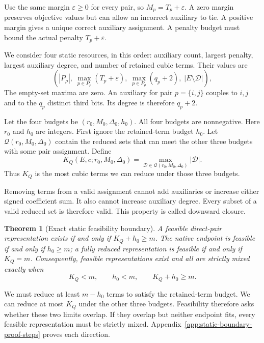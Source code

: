 \documentclass[a4paper,onecolumn,11pt,unpublished]{quantumarticle}
\newtheorem{theorem}[theorem]{Theorem}
\theoremstyle{remark}
\begin{document}
Use the same margin $\varepsilon\geq0$ for every pair, so
$M_p=T_p+\varepsilon$. A zero margin preserves objective values but can
allow an incorrect auxiliary to tie. A positive margin gives a unique
correct auxiliary assignment. A penalty budget must bound the actual
penalty $T_p+\varepsilon$.

We consider four static resources, in this order: auxiliary count, largest
penalty, largest auxiliary degree, and number of retained cubic terms.
Their values are
\[
 \left(|P_\rho|,\;\max_{p\in P_\rho}(T_p+\varepsilon),\;
 \max_{p\in P_\rho}(q_p+2),\;|E\setminus\mathcal D|\right),
\]
The empty-set maxima are zero. An auxiliary for pair $p=\{i,j\}$ couples
to $i,j$ and to the $q_p$ distinct third bits. Its degree is therefore
$q_p+2$.

Let the four budgets be $(r_0,M_0,\Delta_0,h_0)$.
All four budgets are nonnegative.
Here $r_0$ and $h_0$ are integers.
First ignore the retained-term budget $h_0$. Let
$\mathcal Q(r_0,M_0,\Delta_0)$ contain the reduced sets that can meet the
other three budgets with some pair assignment. Define
\begin{equation}
 K_Q(E,c;r_0,M_0,\Delta_0)
 =\max_{\mathcal D\in\mathcal Q(r_0,M_0,\Delta_0)}|\mathcal D|.
 \label{eq:static-reduction-capacity}
\end{equation}
Thus $K_Q$ is the most cubic terms we can reduce under those three budgets.

Removing terms from a valid assignment cannot add auxiliaries or increase
either signed coefficient sum. It also cannot increase auxiliary degree.
Every subset of a valid reduced set is therefore valid. This property is
called downward closure.

\begin{theorem}[Exact static feasibility boundary]
\label{thm:static-phase-boundary}
A feasible direct-pair representation exists if and only if $K_Q+h_0\geq m$.
The native endpoint is feasible if and only if $h_0\geq m$; a fully reduced
representation is feasible if and only if $K_Q=m$. Consequently, feasible
representations exist and all are strictly mixed exactly when
\begin{equation}
 K_Q<m,\qquad h_0<m,\qquad K_Q+h_0\geq m.
 \label{eq:static-mixed-only}
\end{equation}
\end{theorem}
We must reduce at least $m-h_0$ terms to satisfy the retained-term budget.
We can reduce at most $K_Q$ under the other three budgets.
Feasibility therefore asks whether these two limits overlap.
If they overlap but neither endpoint fits, every feasible representation
must be strictly mixed.
Appendix~\ref{app:static-boundary-proof-steps} proves each direction.
\end{document}
